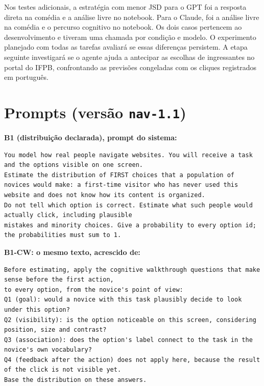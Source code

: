 \documentclass[12pt]{article}
\newcommand{\code}[1]{\texttt{#1}}
\begin{document}
Nos testes adicionais, a estratégia com menor JSD para o GPT foi a resposta direta na comédia e a análise livre no notebook. Para o Claude, foi a análise livre na comédia e o percurso cognitivo no notebook. Os dois casos pertencem ao desenvolvimento e tiveram uma chamada por condição e modelo. O experimento planejado com todas as tarefas avaliará se essas diferenças persistem. A etapa seguinte investigará se o agente ajuda a antecipar as escolhas de ingressantes no portal do IFPB, confrontando as previsões congeladas com os cliques registrados em português.

\clearpage
{}
\makeatletter\renewcommand{\@biblabel}[1]{}\makeatother



\clearpage\appendix

\section{Prompts (versão \code{nav-1.1})}
\label{ap:prompts}

\textbf{B1 (distribuição declarada), prompt do sistema:}
\begin{lstlisting}
You model how real people navigate websites. You will receive a task and the options visible on one screen.
Estimate the distribution of FIRST choices that a population of novices would make: a first-time visitor who has never used this website and does not know how its content is organized.
Do not tell which option is correct. Estimate what such people would actually click, including plausible
mistakes and minority choices. Give a probability to every option id; the probabilities must sum to 1.
\end{lstlisting}

\textbf{B1-CW: o mesmo texto, acrescido de:}
\begin{lstlisting}
Before estimating, apply the cognitive walkthrough questions that make sense before the first action,
to every option, from the novice's point of view:
Q1 (goal): would a novice with this task plausibly decide to look under this option?
Q2 (visibility): is the option noticeable on this screen, considering position, size and contrast?
Q3 (association): does the option's label connect to the task in the novice's own vocabulary?
Q4 (feedback after the action) does not apply here, because the result of the click is not visible yet.
Base the distribution on these answers.
\end{lstlisting}
\end{document}
